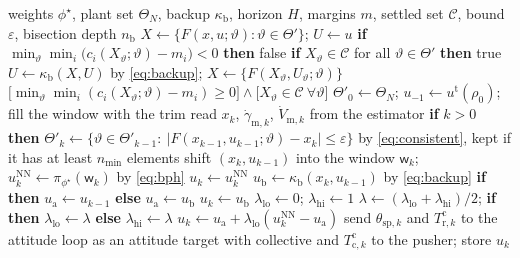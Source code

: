 \begin{algorithm}[t]\caption{HOT with the lift-safety module, online loop}\label{alg:online}\begin{algorithmic}[1]
\Require weights $\phi^\star$, plant set $\Theta_N$, backup $\kappa_{\mathrm b}$, horizon $H$, margins $m$, settled set $\mathcal C$, bound $\varepsilon$, bisection depth $n_{\mathrm b}$
  \State $X\leftarrow\{F(x,u;\vartheta):\vartheta\in\Theta'\}$; $U\leftarrow u$
    \State \textbf{if} $\min_{\vartheta}\min_i\big(c_i(X_\vartheta;\vartheta)-m_i\big)<0$ \textbf{then} \Return false
    \State \textbf{if} $X_\vartheta\in\mathcal C$ for all $\vartheta\in\Theta'$ \textbf{then} \Return true
    \State $U\leftarrow\kappa_{\mathrm b}(X,U)$ by \eqref{eq:backup}; $X\leftarrow\{F(X_\vartheta,U_\vartheta;\vartheta)\}$
  \EndFor
  \State \Return $\big[\min_{\vartheta}\min_i(c_i(X_\vartheta;\vartheta)-m_i)\ge0\big]\wedge\big[X_\vartheta\in\mathcal C\ \forall\vartheta\big]$
\EndFunction
\State $\Theta'_0\leftarrow\Theta_N$; $u_{-1}\leftarrow u^{\mathrm t}(\rho_0)$; fill the window with the trim
  \State read $x_k$, $\dot\gamma_{\mathrm m,k}$, $\dot V_{\mathrm m,k}$ from the estimator
  \State \textbf{if} $k>0$ \textbf{then} $\Theta'_k\leftarrow\{\vartheta\in\Theta'_{k-1}:\ |F(x_{k-1},u_{k-1};\vartheta)-x_k|\le\varepsilon\}$ by \eqref{eq:consistent}, kept if it has at least $n_{\min}$ elements
  \State shift $(x_k,u_{k-1})$ into the window $\mathsf w_k$; $u^{\mathrm{NN}}_k\leftarrow\pi_{\phi^\star}(\mathsf w_k)$ by \eqref{eq:bph}
    \State $u_k\leftarrow u^{\mathrm{NN}}_k$
  \Else
    \State $u_{\mathrm b}\leftarrow\kappa_{\mathrm b}(x_k,u_{k-1})$ by \eqref{eq:backup}
    \State \textbf{if}  \textbf{then} $u_{\mathrm a}\leftarrow u_{k-1}$ \textbf{else} $u_{\mathrm a}\leftarrow u_{\mathrm b}$
      \State $u_k\leftarrow u_{\mathrm b}$
    \Else
      \State $\lambda_{\mathrm{lo}}\leftarrow0$; $\lambda_{\mathrm{hi}}\leftarrow1$
        \State $\lambda\leftarrow(\lambda_{\mathrm{lo}}+\lambda_{\mathrm{hi}})/2$; \textbf{if}  \textbf{then} $\lambda_{\mathrm{lo}}\leftarrow\lambda$ \textbf{else} $\lambda_{\mathrm{hi}}\leftarrow\lambda$
      \EndFor
      \State $u_k\leftarrow u_{\mathrm a}+\lambda_{\mathrm{lo}}(u^{\mathrm{NN}}_k-u_{\mathrm a})$
    \EndIf
  \EndIf
  \State send $\theta_{\mathrm{sp},k}$ and $T^{\mathrm c}_{\mathrm r,k}$ to the attitude loop as an attitude target with collective and $T^{\mathrm c}_{\mathrm c,k}$ to the pusher; store $u_k$
\EndFor
\end{algorithmic}\end{algorithm}

